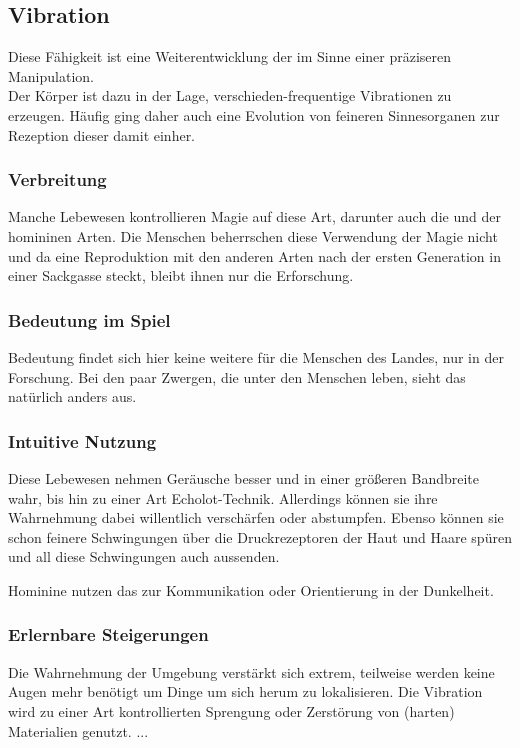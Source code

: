 \subsection{Vibration}\label{magie:vibration}
Diese Fähigkeit ist eine Weiterentwicklung der  im Sinne einer präziseren Manipulation.\\
Der Körper ist dazu in der Lage, verschieden-frequentige Vibrationen zu erzeugen. 
Häufig ging daher auch eine Evolution von feineren Sinnesorganen zur Rezeption dieser damit einher.

\subsubsection{Verbreitung}
Manche Lebewesen kontrollieren Magie auf diese Art, darunter auch die  und  der homininen Arten. Die Menschen beherrschen diese Verwendung der Magie nicht und da eine Reproduktion mit den anderen Arten nach der ersten Generation in einer Sackgasse steckt, bleibt ihnen nur die Erforschung.

\subsubsection{Bedeutung im Spiel}
Bedeutung findet sich hier keine weitere für die Menschen des Landes, nur in der Forschung. 
Bei den paar Zwergen, die unter den Menschen leben, sieht das natürlich anders aus.

\subsubsection{Intuitive Nutzung}
Diese Lebewesen nehmen Geräusche besser und in einer größeren Bandbreite wahr, bis hin zu einer Art Echolot-Technik. 
Allerdings können sie ihre Wahrnehmung dabei willentlich verschärfen oder abstumpfen. 
Ebenso können sie schon feinere Schwingungen über die Druckrezeptoren der Haut und Haare spüren und all diese Schwingungen auch aussenden.

Hominine nutzen das zur Kommunikation oder Orientierung in der Dunkelheit. 

\subsubsection{Erlernbare Steigerungen}
\begin{outline}
	\1 Die Wahrnehmung der Umgebung verstärkt sich extrem, teilweise werden keine Augen mehr benötigt um Dinge um sich herum zu lokalisieren. 
	\1 Die Vibration wird zu einer Art kontrollierten Sprengung oder Zerstörung von (harten) Materialien genutzt.
	\1 ...
\end{outline}

